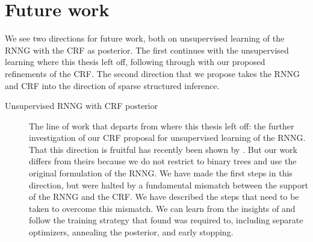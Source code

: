 \section{Future work}
  We see two directions for future work, both on unsupervised learning of the RNNG with the CRF as posterior. The first continues with the unsupervised learning where this thesis left off, following through with our proposed refinements of the CRF. The second direction that we propose takes the RNNG and CRF into the direction of sparse structured inference.

  \begin{description}

    \item[Unsupervised RNNG with CRF posterior]
      The line of work that departs from where this thesis left off: the further investigation of our CRF proposal for unsupervised learning of the RNNG. That this direction is fruitful has recently been shown by \citet{kim2019unsupervised}. But our work differs from theirs because we do not restrict to binary trees and use the original formulation of the RNNG. We have made the first steps in this direction, but were halted by a fundamental mismatch between the support of the RNNG and the CRF. We have described the steps that need to be taken to overcome this mismatch. We can learn from the insights of \cite{kim2019unsupervised} and follow the training strategy that found was required to, including separate optimizers, annealing the posterior, and early stopping.


\end{description}
